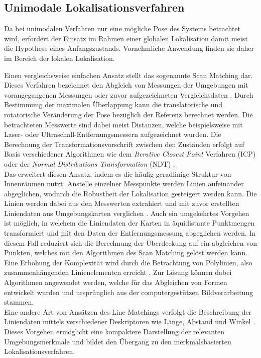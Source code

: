 \subsection{Unimodale Lokalisationsverfahren}
Da bei unimodalen Verfahren nur eine mögliche Pose des Systems betrachtet wird, erfordert der Einsatz im Rahmen einer globalen Lokalisation damit meist die \red[(sinnvolle)] Hypothese eines Anfangszustands. Vornehmliche Anwendung finden sie daher im Bereich der lokalen Lokalisation. 

Einen vergleichsweise einfachen Ansatz stellt das sogenannte Scan Matching  dar. Dieses Verfahren bezeichnet den Abgleich \red[(Matching)] von Messungen der Umgebungen mit vorangegangenen Messungen \cite{Gutmann1996} oder zuvor aufgezeichneten Vergleichsdaten \cite{Gutmann1998}. Durch Bestimmung der maximalen Überlappung kann die translatorische und rotatorische Veränderung der Pose bezüglich der Referenz berechnet werden. Die betrachteten Messwerte sind dabei meist Distanzen, welche beispielsweise mit Laser- \cite{Diosi2007} oder Ultraschall-Entfernungsmessern \cite{Burguera2005} aufgezeichnet wurden. Die Berechnung der Transformationsvorschrift zwischen den Zuständen erfolgt auf Basis verschiedener Algorithmen wie dem \textit{Iterative Closest Point} Verfahren (ICP) \cite{Besl1992}\cite{Lu1994} oder der \textit{Normal Distributions Transformation} (NDT) \cite{Biber2003}.\\

Das  erweitert diesen Ansatz, indem es die häufig geradlinige Struktur von Innenräumen nutzt. Anstelle einzelner Messpunkte werden Linien aufeinander abgeglichen, wodurch die Robustheit der Lokalisation gesteigert werden kann. Die Linien werden dabei aus den Messwerten extrahiert und mit zuvor erstellten Liniendaten aus Umgebungskarten verglichen \cite{Cox1991}\cite{Gutmann1999}. Auch ein umgekehrtes Vorgehen ist möglich, in welchem die Liniendaten der Karten in äquidistante Punktmengen transformiert und mit den Daten der Entfernungsmessung abgeglichen werden. In diesem Fall reduziert sich die Berechnung der Überdeckung auf ein abgleichen von Punkten, welches mit den Algorithmen des Scan Matching gelöst werden kann.\\
Eine Erhöhung der Komplexität wird durch die Betrachtung von Polylinien, also zusammenhängenden Linienelementen erreicht \cite{Wolter2004}. Zur Lösung können dabei Algorithmen angewendet werden, welche für das Abgleichen von Formen entwickelt wurden und ursprünglich aus der computergestützen Bildverarbeitung stammen.\\
Eine andere Art von Ansätzen des Line Matchings verfolgt die Beschreibung der Liniendaten mittels verschiedener Deskriptoren wie Länge, Abstand und Winkel \cite{Frey2014} \cite{Garulli2005}. Dieses Vorgehen ermöglicht eine kompaktere Darstellung der relevanten Umgebungsmerkmale und bildet den Übergang zu den merkmalsbasierten Lokalisationsverfahren.\\

